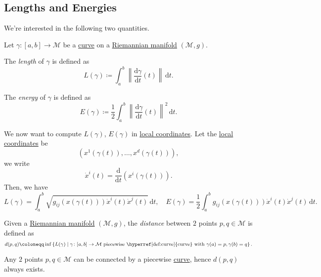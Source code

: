 \subsection{Lengths and Energies}
We're interested in the following two quantities.

\begin{definition*}
	Let \(\gamma \colon [a, b] \to \mathcal{M} \) be a \hyperref[def:curve]{curve} on a \hyperref[def:Riemannian-manifold]{Riemannian manifold} \((\mathcal{M} , g)\).

	\begin{definition}[Length]\label{def:length}
		The \emph{length} of \(\gamma \) is defined as
		\[
			L(\gamma ) \coloneqq \int_{a}^{b} \left\lVert \frac{\mathrm{d}\gamma }{\mathrm{d}t} (t) \right\rVert \,\mathrm{d}t .
		\]
	\end{definition}

	\begin{definition}[Energy]\label{def:energy}
		The \emph{energy} of \(\gamma \) is defined as
		\[
			E(\gamma )\coloneqq \frac{1}{2} \int_{a}^{b} \left\lVert \frac{\mathrm{d}\gamma }{\mathrm{d}t} (t) \right\rVert ^2 \,\mathrm{d}t .
		\]
	\end{definition}
\end{definition*}

We now want to compute \(L(\gamma )\), \(E(\gamma )\) in \hyperref[def:coordinate-chart]{local coordinates}. Let the \hyperref[def:coordinate-chart]{local coordinates} be
\[
	(x^1(\gamma (t)), \ldots , x^d(\gamma (t))),
\]
we write
\[
	\dot{x}^i (t) = \frac{\mathrm{d}}{\mathrm{d}t} (x^i (\gamma (t))).
\]
Then, we have
\[
	L(\gamma ) = \int_{a}^{b} \sqrt{g_{ij} (x(\gamma (t))) \dot{x}^i(t)\dot{x}^j(t)} \,\mathrm{d}t, \quad
	E(\gamma ) = \frac{1}{2} \int_{a}^{b} g_{ij} (x(\gamma (t))) \dot{x}^i(t)\dot{x}^j(t) \,\mathrm{d}t.
\]

\begin{definition}[Distance]\label{def:distance}
	Given a \hyperref[def:Riemannian-manifold]{Riemannian manifold} \((\mathcal{M} , g)\), the \emph{distance} between \(2\) points \(p, q\in \mathcal{M} \) is defined as
	\[
		d(p, q)\coloneqq \inf \left\{ L(\gamma ) \mid \gamma \colon [a, b]\to \mathcal{M} \text{ piecewise \hyperref[def:curve]{curve} with }\gamma (a)=p, \gamma (b)=q \right\} .
	\]
\end{definition}

\begin{note}
	Any \(2\) points \(p, q\in \mathcal{M} \) can be connected by a piecewise \hyperref[def:curve]{curve}, hence \(d(p, q)\) always exists.
\end{note}

